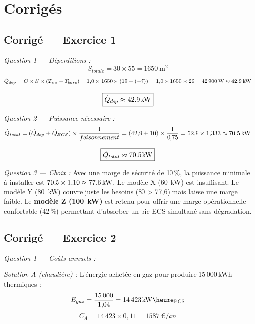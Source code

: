 \newpage
\section*{Corrigés}

\subsection*{Corrigé — Exercice 1}

\textit{Question 1 — Déperditions :}
\[
  S_{totale} = 30 \times 55 = \SI{1650}{\square\metre}
\]
\[
  \dot{Q}_{dep} = G \times S \times (T_{int} - T_{base}) = 1{,}0 \times 1650 \times (19 - (-7)) = 1{,}0 \times 1650 \times 26 = \SI{42\,900}{\watt} \approx \SI{42{,}9}{\kilo\watt}
\]

\[
  \boxed{\dot{Q}_{dep} \approx \SI{42{,}9}{\kilo\watt}}
\]

\textit{Question 2 — Puissance nécessaire :}
\[
  \dot{Q}_{total} = (\dot{Q}_{dep} + \dot{Q}_{ECS}) \times \frac{1}{foisonnement} = (42{,}9 + 10) \times \frac{1}{0{,}75} = 52{,}9 \times 1{,}333 \approx \SI{70{,}5}{\kilo\watt}
\]

\[
  \boxed{\dot{Q}_{total} \approx \SI{70{,}5}{\kilo\watt}}
\]

\textit{Question 3 — Choix :} Avec une marge de sécurité de 10\,\%, la puissance minimale à installer est $70{,}5 \times 1{,}10 \approx \SI{77{,}6}{\kilo\watt}$. Le modèle X (\SI{60}{\kilo\watt}) est insuffisant. Le modèle Y (\SI{80}{\kilo\watt}) couvre juste les besoins (80 > 77,6) mais laisse une marge faible. Le \textbf{modèle Z (\SI{100}{\kilo\watt})} est retenu pour offrir une marge opérationnelle confortable (42\,\%) permettant d'absorber un pic ECS simultané sans dégradation.


\subsection*{Corrigé — Exercice 2}

\textit{Question 1 — Coûts annuels :}

\textit{Solution A (chaudière) :} L'énergie achetée en gaz pour produire 15\,000\,kWh thermiques :
\[
  E_{gaz} = \frac{15\,000}{1{,}04} = \SI{14\,423}{\kilo\watt\heure_{PCS}}
\]
\[
  C_A = 14\,423 \times 0{,}11 = \SI{1587}{\euro\per an}
\]

